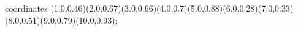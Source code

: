 					coordinates { (1.0,0.46)(2.0,0.67)(3.0,0.66)(4.0,0.7)(5.0,0.88)(6.0,0.28)(7.0,0.33)(8.0,0.51)(9.0,0.79)(10.0,0.93)};